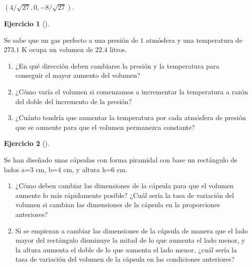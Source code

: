\documentclass[
  a4paper,
]{scrreport}
\theoremstyle{definition}
\newtheorem{exercise}{Ejercicio}[chapter]
\theoremstyle{remark}
\begin{document}
\begin{tcolorbox}[enhanced jigsaw, toprule=.15mm, bottomrule=.15mm, coltitle=black, toptitle=1mm, breakable, left=2mm, arc=.35mm, title=\textcolor{quarto-callout-tip-color}{\faLightbulb}\hspace{0.5em}{Solución}, titlerule=0mm, colback=white, colbacktitle=quarto-callout-tip-color!10!white, colframe=quarto-callout-tip-color-frame, bottomtitle=1mm, rightrule=.15mm, leftrule=.75mm, opacitybacktitle=0.6, opacityback=0]

\((4/\sqrt{27}, 0, -8/\sqrt{27})\).

\end{tcolorbox}

\begin{exercise}[]\protect\hypertarget{exr-derivada-direccional-gas-perfecto}{}\label{exr-derivada-direccional-gas-perfecto}

Se sabe que un gas perfecto a una presión de \(1\) atmósfera y una
temperatura de \(273.1\) K ocupa un volumen de \(22.4\) litros.

\begin{enumerate}
\def\labelenumi{\alph{enumi}.}
\item
  ¿En qué dirección deben cambiarse la presión y la temperatura para
  conseguir el mayor aumento del volumen?
\item
  ¿Cómo varía el volumen si comenzamos a incrementar la temperatura a
  razón del doble del incremento de la presión?
\item
  ¿Cuánto tendría que aumentar la temperatura por cada atmósfera de
  presión que se aumente para que el volumen permanezca constante?
\end{enumerate}

\end{exercise}

\begin{exercise}[]\protect\hypertarget{exr-derivada-direccional-capsulas}{}\label{exr-derivada-direccional-capsulas}

Se han diseñado unas cápsulas con forma piramidal con base un rectángulo
de lados a=3 cm, b=4 cm, y altura h=6 cm.

\begin{enumerate}
\def\labelenumi{\alph{enumi}.}
\item
  ¿Cómo deben cambiar las dimensiones de la cápsula para que el volumen
  aumente lo más rápidamente posible? ¿Cuál sería la tasa de variación
  del volumen si cambian las dimensiones de la cápsula en la
  proporciones anteriores?
\item
  Si se empiezan a cambiar las dimensiones de la cápsula de manera que
  el lado mayor del rectángulo disminuye la mitad de lo que aumenta el
  lado menor, y la altura aumenta el doble de lo que aumenta el lado
  menor, ¿cuál sería la tasa de variación del volumen de la cápsula en
  las condiciones anteriores?
\end{enumerate}

\end{exercise}
\end{document}

